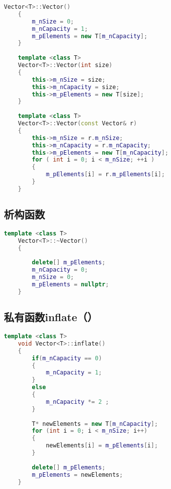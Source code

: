 \documentclass{ctexart} %
\begin{document}
\begin{lstlisting}[language = c++, caption = Vector()]
    Vector<T>::Vector()
    {
        m_nSize = 0;                   
        m_nCapacity = 1;             
        m_pElements = new T[m_nCapacity]; 
    }
    
    template <class T>
    Vector<T>::Vector(int size)
    {
        this->m_nSize = size;
        this->m_nCapacity = size;
        this->m_pElements = new T[size];
    }
    
    template <class T>
    Vector<T>::Vector(const Vector& r)
    {
        this->m_nSize = r.m_nSize;
        this->m_nCapacity = r.m_nCapacity;
        this->m_pElements = new T[m_nCapacity];
        for ( int i = 0; i < m_nSize; ++i )
        {
            m_pElements[i] = r.m_pElements[i];
        }
    }
\end{lstlisting}

\subsection{析构函数}
\begin{lstlisting}[caption = ~Vector, language = c++]
    template <class T>
    Vector<T>::~Vector()
    {
    
        delete[] m_pElements;
        m_nCapacity = 0;
        m_nSize = 0;
        m_pElements = nullptr;
    }
\end{lstlisting}

\subsection{私有函数inflate（）}
\begin{lstlisting}[caption = inflate(), language = c++]
    template <class T>
    void Vector<T>::inflate()
    {
        if(m_nCapacity == 0)
        {
            m_nCapacity = 1;
        }
        else
        {
            m_nCapacity *= 2 ;
        }
    
        T* newElements = new T[m_nCapacity];
        for (int i = 0; i < m_nSize; i++) 
        {
            newElements[i] = m_pElements[i];
        }
    
        delete[] m_pElements;
        m_pElements = newElements;
    }
    
\end{lstlisting}
\end{document}
